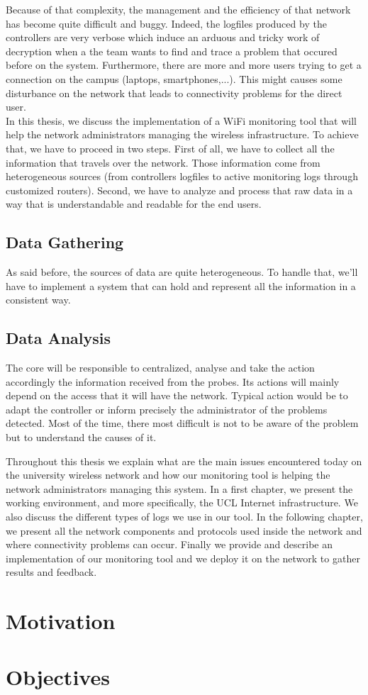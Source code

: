 Because of that complexity, the management and the efficiency of that network has become quite difficult and buggy. Indeed, the logfiles produced by the controllers are very verbose which induce an arduous and tricky work of decryption when a the team wants to find and trace a problem that occured before on the system. Furthermore, there are more and more users trying to get a connection on the campus (laptops, smartphones,...). This might causes some disturbance on the network that leads to connectivity problems for the direct user.\\

In this thesis, we discuss the implementation of a WiFi monitoring tool that will help the network administrators managing the wireless infrastructure. To achieve that, we have to proceed in two steps. First of all, we have to collect all the information that travels over the network. Those information come from heterogeneous sources (from controllers logfiles to active monitoring logs through customized routers). Second, we have to analyze and process that raw data in a way that is understandable and readable for the end users.

\subsection{Data Gathering}
As said before, the sources of data are quite heterogeneous. To handle that, we'll have to implement a system that can hold and represent all the information in a consistent way.

\subsection{Data Analysis}
The core will be responsible to centralized, analyse and take the action accordingly the information received from the probes. Its actions will mainly depend on the access that it will have the network. Typical action would be to adapt the controller or inform precisely the administrator of the problems detected. Most of the time, there most difficult is not to be aware of the problem but to understand the causes of it.

Throughout this thesis we explain what are the main issues encountered today on the university wireless network and how our monitoring tool is helping the network administrators managing this system. In a first chapter, we present the working environment, and more specifically, the UCL Internet infrastructure. We also discuss the different types of logs we use in our tool. In the following chapter, we present all the network components and protocols used inside the network and where connectivity problems can occur. Finally we provide and describe an implementation of our monitoring tool and we deploy it on the network to gather results and feedback.





\section{Motivation}

\section{Objectives}